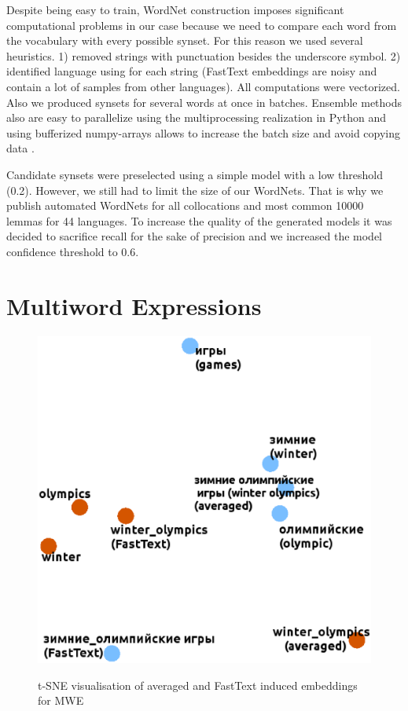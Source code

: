 \documentclass[11pt,a4paper]{article}
\begin{document}
Despite being easy to train, WordNet construction imposes significant computational problems in our case because we need to compare each word from the vocabulary with every possible synset. For this reason we used several heuristics. 1) removed strings with punctuation besides the underscore symbol. 2) identified language using \cite{Joulin2016} for each string (FastText embeddings are noisy and contain a lot of samples from other languages).  All computations were vectorized. Also we produced synsets for several words at once in batches. Ensemble methods also are easy to parallelize using the multiprocessing realization in Python and using bufferized numpy-arrays allows to increase the batch size and avoid copying data \cite{gorelick2014high}.

Candidate synsets were preselected using a simple model with a low threshold (0.2). However, we still had to limit the size of our WordNets. That is why we publish automated WordNets for all collocations and most common 10000 lemmas for 44 languages. To increase the quality of the generated models it was decided to sacrifice recall for the sake of precision and we increased the model confidence threshold to 0.6.


\section{Multiword Expressions}
\begin{figure}
	
	\centering
	\small
	\includegraphics[scale=0.3]{mwe}\\
	
	\caption{t-SNE visualisation of averaged and FastText induced embeddings for MWE}
	\label{mwe}
\end{figure}
\end{document}
